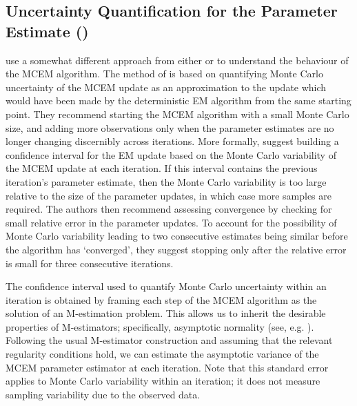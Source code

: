 \documentclass[11pt, oneside]{article}   	%
\begin{document}
    


\subsection{Uncertainty Quantification for the Parameter Estimate (\citealp{Boo99})}

 \citet{Boo99} use a somewhat different approach from either \citet{Wei90} or \citet{Cha95} to understand the behaviour of the MCEM algorithm. The method of \citeauthor{Boo99} is based on quantifying Monte Carlo uncertainty of the MCEM update as an approximation to the update which would have been made by the deterministic EM algorithm from the same starting point. They recommend starting the MCEM algorithm with a small Monte Carlo size, and adding more observations only when the parameter estimates are no longer changing discernibly across iterations. More formally, \citeauthor{Boo99} suggest building a confidence interval for the EM update based on the Monte Carlo variability of the MCEM update at each iteration. If this interval contains the previous iteration's parameter estimate, then the Monte Carlo variability is too large relative to the size of the parameter updates, in which case more samples are required. The authors then recommend assessing convergence by checking for small relative error in the parameter updates. To account for the possibility of Monte Carlo variability leading to two consecutive estimates being similar before the algorithm has `converged', they suggest stopping only after the relative error is small for three consecutive iterations.

The confidence interval used to quantify Monte Carlo uncertainty within an iteration is obtained by framing each step of the MCEM algorithm as the solution of an M-estimation problem. This allows us to inherit the desirable properties of M-estimators; specifically, asymptotic normality (see, e.g. \citealp{van98}). Following the usual M-estimator construction and assuming that the relevant regularity conditions hold, we can estimate the asymptotic variance of the MCEM parameter estimator at each iteration. Note that this standard error applies to Monte Carlo variability within an iteration; it does not measure sampling variability due to the observed data. 
\end{document}
